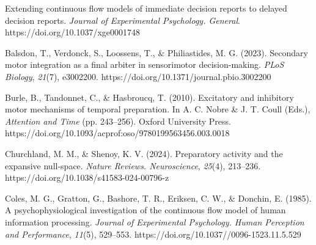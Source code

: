 \begin{references}
 Extending continuous flow models of immediate decision reports to delayed decision reports. \emph{Journal of Experimental Psychology. General}. https://doi.org/10.1037/xge0001748

 \del{,} 


Balsdon, T., Verdonck, S., Loossens, T., \& Philiastides, M. G. (2023). Secondary motor integration as a final arbiter in sensorimotor decision-making. \emph{PLoS Biology}, \emph{21}(7), e3002200. https://doi.org/10.1371/journal.pbio.3002200

Burle, B., Tandonnet, C., \& Hasbroucq, T. (2010). Excitatory and inhibitory motor mechanisms of temporal preparation. In A. C. Nobre \& J. T. Coull (Eds.), \emph{Attention and Time} (pp. 243--256). Oxford University Press. https://doi.org/10.1093/acprof:oso/9780199563456.003.0018

Churchland, M. M., \& Shenoy, K. V. (2024). Preparatory activity and the expansive null-space. \emph{Nature Reviews. Neuroscience}, \emph{25}(4), 213--236. https://doi.org/10.1038/s41583-024-00796-z

 \new{,} 

Coles, M. G., Gratton, G., Bashore, T. R., Eriksen, C. W., \& Donchin, E. (1985). A psychophysiological investigation of the continuous flow model of human information processing. \emph{Journal of Experimental Psychology. Human Perception and Performance}, \emph{11}(5), 529--553. https://doi.org/10.1037//0096-1523.11.5.529

 \del{,} 


\end{references}
